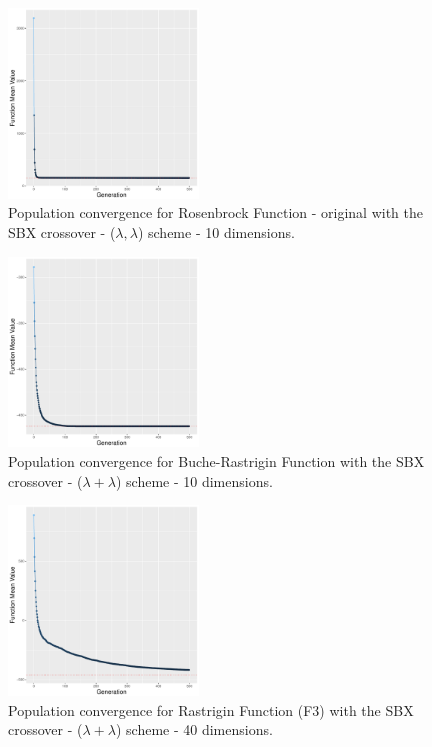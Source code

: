 \begin{figure}[t]
	\includegraphics[width=0.45\textwidth]{img/covergency_unimodal_sbx_8_dim_10_tsize_9.pdf}
	\caption{Population convergence for Rosenbrock Function - original with the SBX crossover - ($\lambda, \lambda$) scheme -  10 dimensions.}
	\label{convergence-sbx-8-a}
\end{figure}


\begin{figure}[t]
	\includegraphics[width=0.45\textwidth]{img/covergency_multimodal_sbx_4_dim_10_tsize_5.pdf}
	\caption{Population convergence for Buche-Rastrigin Function with the SBX crossover - ($\lambda + \lambda$) scheme - 10 dimensions.}
	\label{convegence-sbx-4-a}
\end{figure}

\begin{figure}[t]
	\includegraphics[width=0.45\textwidth]{img/covergency_multimodal_sbx_3_dim_40_tsize_4.pdf}
	\caption{Population convergence for Rastrigin Function (F3) with the SBX crossover - ($\lambda + \lambda$) scheme - 40 dimensions.}
	\label{convegence-sbx-3-a}
\end{figure}



